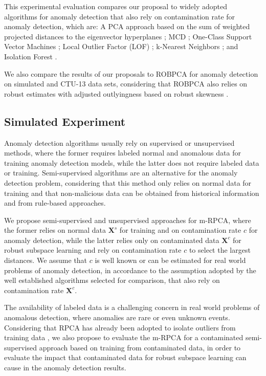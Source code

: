 This experimental evaluation compares our proposal to widely adopted algorithms for anomaly detection that also rely on contamination rate for anomaly detection, which are: A PCA approach based on the sum of weighted projected distances to the eigenvector hyperplanes \cite{shyu2003novel}; MCD \cite{rousseeuw1984mcd,rousseeuw1999fastmcd}; One-Class Support Vector Machines \cite{scholkopf2001estimating}; Local Outlier Factor (LOF) \cite{breunig2000lof}; k-Nearest Neighbors \cite{angiulli2002fast}; and Isolation Forest \cite{liu2008isolation}.

We also compare the results of our proposals to ROBPCA for anomaly detection on simulated and CTU-13 data sets, considering that ROBPCA also relies on robust estimates with adjusted outlyingness based on robust skewness \cite{hubert2009robustskewed}.

\subsection{Simulated Experiment}
\label{sec:4_SimulatedScenario}

Anomaly detection algorithms usually rely on supervised or unsupervised methods, where the former requires labeled normal and anomalous data for training anomaly detection models, while the latter does not require labeled data or training. Semi-supervised algorithms are an alternative for the anomaly detection problem, considering that this method only relies on normal data for training and that non-malicious data can be obtained from historical information and from rule-based approaches. 

We propose semi-supervised and unsupervised approaches for m-RPCA, where the former relies on normal data $\pmb{X}^s$ for training and on contamination rate $c$ for anomaly detection, while the latter relies only on contaminated data $\pmb{X}^c$ for robust subspace learning and rely on contamination rate $c$ to select the largest distances. We assume that $c$ is well known or can be estimated for real world problems of anomaly detection, in accordance to the assumption adopted by the well established algorithms \cite{zhao2019pyod} selected for comparison, that also rely on contamination rate $\pmb{X}^c$.

The availability of labeled data is a challenging concern in real world problems of anomalous detection, where anomalies are rare or even unknown events. Considering that RPCA has already been adopted to isolate outliers from training data \cite{zhou2017anomaly}, we also propose to evaluate the m-RPCA for a contaminated semi-supervised approach based on training from contaminated data, in order to evaluate the impact that contaminated data for robust subspace learning can cause in the anomaly detection results.

